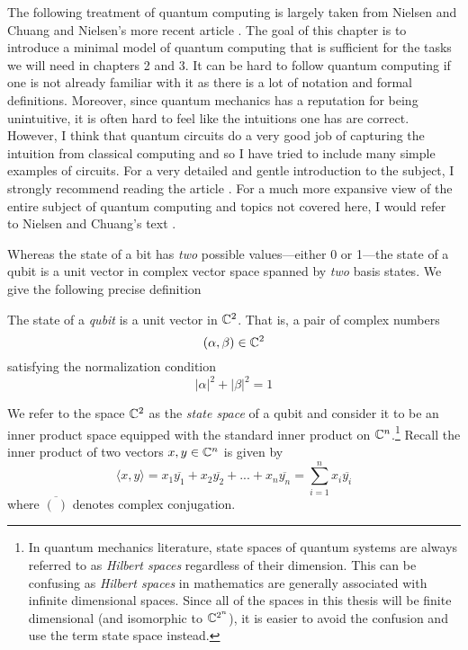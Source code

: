    The following treatment of quantum computing is largely taken from Nielsen and Chuang \cite{Nielsen&Chuang} and 
   Nielsen's more recent article \cite{QC}.  The goal of this chapter is to introduce a minimal model of quantum 
   computing that is sufficient for the tasks we will need in chapters 2 and 3. It can be hard to follow quantum 
   computing if one is not already familiar with it as there is a lot of notation and formal definitions. Moreover, 
   since quantum mechanics has a reputation for being unintuitive, it is often hard to feel like the intuitions one 
   has are correct.  However, I think that quantum circuits do a very good job of capturing the intuition from 
   classical computing and so I have tried to include many simple examples of circuits. For a very detailed and 
   gentle introduction to the subject, I strongly recommend reading the article \cite{QC}. For a much more 
   expansive view of the entire subject of quantum computing and topics not covered here, I would refer to Nielsen 
   and Chuang's text \cite{Nielsen&Chuang}.  
        
        Whereas the state of a bit has \emph{two} possible values---either 0 or 1---the state of a qubit is a unit
        vector in complex vector space spanned by \emph{two} basis states. We give the following precise definition
        \begin{definition}
            The state of a \emph{qubit} is a unit vector in $\mathbb{C}^2$. That is, a pair of complex numbers
            \[
                (\alpha, \beta) \in \mathbb{C}^2
            \]
            satisfying the normalization condition %
            \[
                |\alpha|^2 + |\beta|^2 = 1
            \]
        \end{definition}
        
        We refer to the space $\mathbb{C}^2$ as the \emph{state space} of a qubit and consider it to be an inner product 
        space equipped with the standard inner product on $\mathbb{C}^n$.\footnote{In quantum mechanics literature, state 
            spaces of quantum systems are always referred to as \emph{Hilbert spaces} regardless of their 
            dimension. This can be confusing as \emph{Hilbert spaces} in mathematics are generally associated with 
            infinite dimensional spaces. Since all of the spaces in this thesis will be finite dimensional (and 
        isomorphic to $\mathbb{C}^{2^n}$), it is easier to avoid the confusion and use the term state space instead.} 
        Recall the inner product of two vectors $x,y\in \mathbb{C}^n$ is given by
        \[
            \langle x, y \rangle = x_1\overline{y_1} + x_2\overline{y_2} + ... + x_n \overline{y_n} = \sum_{i=1}^n 
            x_i\overline{y_i}
       \]
       where $\overline{(\ )}$ denotes complex conjugation.

